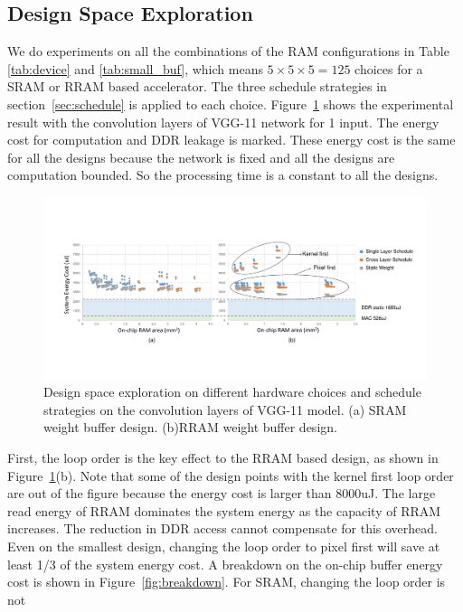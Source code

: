 \subsection{Design Space Exploration}
We do experiments on all the combinations of the RAM configurations in Table \ref{tab:device} and \ref{tab:small_buf}, which means $5\times 5\times 5 = 125$ choices for a SRAM or RRAM based accelerator. The three schedule strategies in section~\ref{sec:schedule} is applied to each choice. Figure~\ref{fig:design_space} shows the experimental result with the convolution layers of VGG-11 network for 1 input. The energy cost for computation and DDR leakage is marked. These energy cost is the same for all the designs because the network is fixed and all the designs are computation bounded. So the processing time is a constant to all the designs.

\begin{figure}[t]
  \centering
  \includegraphics[width=2\columnwidth]{fig/design_space.pdf}
  \caption{Design space exploration on different hardware choices and schedule strategies on the convolution layers of VGG-11 model. (a) SRAM weight buffer design. (b)RRAM weight buffer design.}
  \label{fig:design_space}
\end{figure}

First, the loop order is the key effect to the RRAM based design, as shown in Figure~\ref{fig:design_space}(b). Note that some of the design points with the kernel first loop order are out of the figure because the energy cost is larger than 8000uJ. The large read energy of RRAM dominates the system energy as the capacity of RRAM increases. The reduction in DDR access cannot compensate for this overhead. Even on the smallest design, changing the loop order to pixel first will save at least 1/3 of the system energy cost. A breakdown on the on-chip buffer energy cost is shown in Figure~\ref{fig:breakdown}. For SRAM, changing the loop order is not 

